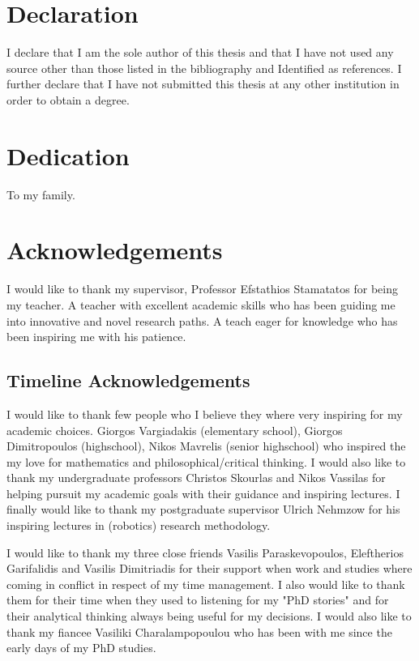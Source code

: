 \documentclass[
    12pt, %
    singlespacing, %
    liststotoc, %
    headsepline, %
]{DoctoralThesis} %
\begin{document}
\section*{Declaration}
I declare that I am the sole author of this thesis and that I have not used any source other than those listed in the bibliography and Identified as references. I further declare that I have not submitted this thesis at any other institution in order to obtain a degree.

\newpage


\section*{Dedication}
To my family.

\newpage
 

\section*{Acknowledgements}
I would like to thank my supervisor, Professor Efstathios Stamatatos for being my teacher. A teacher with excellent academic skills who has been guiding me into innovative and novel research paths. A teach eager for knowledge who has been inspiring me with his patience.

\subsection*{Timeline Acknowledgements}
I would like to thank few people who I believe they where very inspiring for my academic choices. Giorgos Vargiadakis (elementary school), Giorgos Dimitropoulos (highschool), Nikos Mavrelis (senior highschool) who inspired the my love for mathematics and philosophical/critical thinking. I would also like to thank my undergraduate professors Christos Skourlas and Nikos Vassilas for helping pursuit my academic goals with their guidance and inspiring lectures. I finally would like to thank my postgraduate supervisor Ulrich Nehmzow for his inspiring lectures in (robotics) research methodology.

I would like to thank my three close friends Vasilis Paraskevopoulos, Eleftherios Garifalidis and Vasilis Dimitriadis for their support when work and studies where coming in conflict in respect of my time management. I also would like to thank them for their time when they used to listening for my "PhD stories" and for their analytical thinking always being useful for my decisions. I would also like to thank my fiancee Vasiliki Charalampopoulou who has been with me since the early days of my PhD studies.
\end{document}
